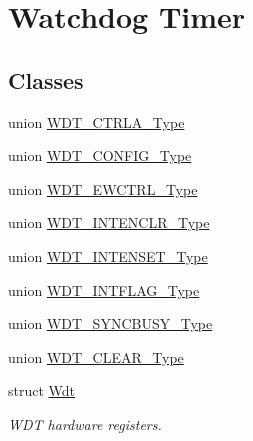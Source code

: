 \hypertarget{group___s_a_m_l21___w_d_t}{}\section{Watchdog Timer}
\label{group___s_a_m_l21___w_d_t}
\subsection*{Classes}
\begin{DoxyCompactItemize}
\item 
union \hyperlink{union_w_d_t___c_t_r_l_a___type}{W\+D\+T\+\_\+\+C\+T\+R\+L\+A\+\_\+\+Type}
\item 
union \hyperlink{union_w_d_t___c_o_n_f_i_g___type}{W\+D\+T\+\_\+\+C\+O\+N\+F\+I\+G\+\_\+\+Type}
\item 
union \hyperlink{union_w_d_t___e_w_c_t_r_l___type}{W\+D\+T\+\_\+\+E\+W\+C\+T\+R\+L\+\_\+\+Type}
\item 
union \hyperlink{union_w_d_t___i_n_t_e_n_c_l_r___type}{W\+D\+T\+\_\+\+I\+N\+T\+E\+N\+C\+L\+R\+\_\+\+Type}
\item 
union \hyperlink{union_w_d_t___i_n_t_e_n_s_e_t___type}{W\+D\+T\+\_\+\+I\+N\+T\+E\+N\+S\+E\+T\+\_\+\+Type}
\item 
union \hyperlink{union_w_d_t___i_n_t_f_l_a_g___type}{W\+D\+T\+\_\+\+I\+N\+T\+F\+L\+A\+G\+\_\+\+Type}
\item 
union \hyperlink{union_w_d_t___s_y_n_c_b_u_s_y___type}{W\+D\+T\+\_\+\+S\+Y\+N\+C\+B\+U\+S\+Y\+\_\+\+Type}
\item 
union \hyperlink{union_w_d_t___c_l_e_a_r___type}{W\+D\+T\+\_\+\+C\+L\+E\+A\+R\+\_\+\+Type}
\item 
struct \hyperlink{struct_wdt}{Wdt}
\begin{DoxyCompactList}\small\item\em W\+D\+T hardware registers. \end{DoxyCompactList}\end{DoxyCompactItemize}
